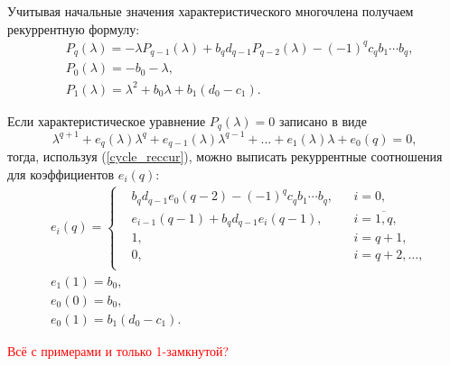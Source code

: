        Учитывая начальные значения характеристического многочлена получаем рекуррентную формулу:
        \begin{equation} \label{cycle_reccur}
            \begin{split}
                & P_q (\lambda) = -\lambda P_{q-1} (\lambda) + b_q d_{q-1} P_{q-2} (\lambda) - (-1)^{q} c_q b_1 \cdots b_q, \\
                & P_0 (\lambda) = - b_0 -\lambda, \\
                & P_1 (\lambda) = \lambda^2 + b_0 \lambda + b_1 (d_0 - c_1).
            \end{split}
        \end{equation}

        Если характеристическое уравнение \( P_q (\lambda) = 0 \) записано в виде
        \begin{equation*}
            \lambda^{q+1} + e_q(\lambda) \lambda^q + e_{q-1}(\lambda) \lambda^{q-1} + \dots + e_{1}(\lambda) \lambda + e_0(q) = 0,
        \end{equation*}
        тогда, используя (\ref{cycle_reccur}), можно выписать рекуррентные  соотношения для коэффициентов \(e_i (q)\):
        \begin{equation} \label{cycle_reccur_coeffs}
            \begin{split}
            & e_i (q) = \left\{\begin{split}
                & b_q d_{q-1} e_0(q-2) - (-1)^q c_q b_1 \cdots b_q, && i = 0, \\
                & e_{i-1} (q-1) + b_q d_{q-1} e_i (q-1), && i = \overline{1,q}, \\
                & 1, && i = q+1, \\
                & 0, && i = q+2, \dots, \\
            \end{split}\right. \\
            & e_{1} (1) = b_0, \\
            & e_{0} (0) = b_0, \\
            & e_{0} (1) = b_1 (d_0 - c_1).
            \end{split}
        \end{equation}

        \textcolor{red}{Всё с примерами и только 1-замкнутой?}


